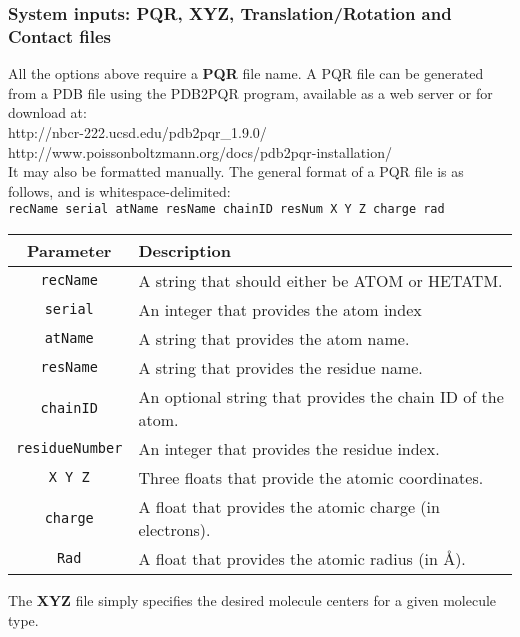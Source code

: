 \clearpage

\subsubsection{System inputs: PQR, XYZ, Translation/Rotation and Contact files }

All the options above require a \textbf{PQR} file name. A PQR file can be generated from a PDB file using the PDB2PQR program, available as a web server or for download at: \\

http://nbcr-222.ucsd.edu/pdb2pqr\_1.9.0/  \\
http://www.poissonboltzmann.org/docs/pdb2pqr-installation/ \\

It may also be formatted manually. The general format of a PQR file is as follows, and is whitespace-delimited: \\

\texttt{recName  serial  atName  resName  chainID  resNum  X  Y  Z  charge rad }\\

  \begin{tabular}{ c | l  }
    \textbf{Parameter} & \textbf{Description} \\ \hline
\texttt{recName} 	&	A string that should either be ATOM or HETATM. \\
\texttt{serial} 	&	An integer that provides the atom index \\
\texttt{atName} 	&	A string that provides the atom name.\\
\texttt{resName}	&	A string that provides the residue name. \\
\texttt{chainID}	&	An optional string that provides the chain ID of the atom.\\
\texttt{residueNumber}  & An integer that provides the residue index.\\
\texttt{X Y Z}	& Three floats that provide the atomic coordinates.\\
\texttt{charge}	& A float that provides the atomic charge (in electrons). \\
\texttt{Rad}		& A float that provides the atomic radius (in \AA).\\
    \hline
  \end{tabular}

\medskip\medskip\medskip \medskip

The \textbf{XYZ} file simply specifies the desired molecule centers for a given molecule type. \\

